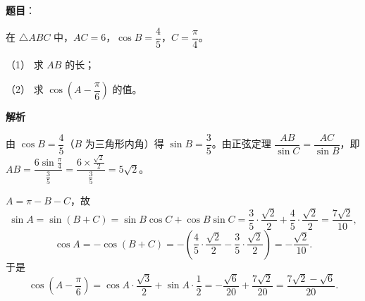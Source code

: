 \begin{answer}

\textbf{题目}：

在 \(\triangle ABC\) 中，\(AC=6\)，\(\cos B=\dfrac{4}{5}\)，\(C=\dfrac{\pi}{4}\)。

（1） 求 \(AB\) 的长；

（2） 求 \(\cos\left(A-\dfrac{\pi}{6}\right)\) 的值。

\textbf{解析}


由 \(\cos B=\dfrac{4}{5}\)（\(B\) 为三角形内角）得 \(\sin B=\dfrac{3}{5}\)。由正弦定理 \(\dfrac{AB}{\sin C}=\dfrac{AC}{\sin B}\)，即 \(AB=\dfrac{6\sin\frac{\pi}{4}}{\frac{3}{5}}=\dfrac{6\times\frac{\sqrt{2}}{2}}{\frac{3}{5}}=5\sqrt{2}\)。


\(A=\pi-B-C\)，故
\nopagebreak[4]
\[
\sin A=\sin(B+C)=\sin B\cos C+\cos B\sin C=\frac{3}{5}\cdot\frac{\sqrt{2}}{2}+\frac{4}{5}\cdot\frac{\sqrt{2}}{2}=\frac{7\sqrt{2}}{10},
\]
\nopagebreak[4]
\[
\cos A=-\cos(B+C)=-\left(\frac{4}{5}\cdot\frac{\sqrt{2}}{2}-\frac{3}{5}\cdot\frac{\sqrt{2}}{2}\right)=-\frac{\sqrt{2}}{10}.
\]
于是
\nopagebreak[4]
\[
\cos\left(A-\frac{\pi}{6}\right)=\cos A\cdot\frac{\sqrt{3}}{2}+\sin A\cdot\frac{1}{2}=-\frac{\sqrt{6}}{20}+\frac{7\sqrt{2}}{20}=\frac{7\sqrt{2}-\sqrt{6}}{20}.
\]



\end{answer}
